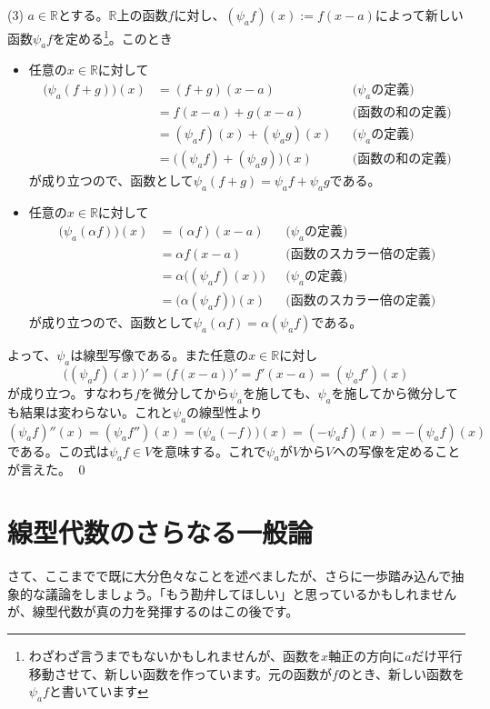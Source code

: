 \noindent (3) $a\in\mathbb{R}$とする。$\mathbb{R}$上の函数$f$に対し、$(\psi_a  f)(x) := f(x-a)$によって新しい函数$\psi_a f$を定める\footnote{わざわざ言うまでもないかもしれませんが、函数を$x$軸正の方向に$a$だけ平行移動させて、新しい函数を作っています。元の函数が$f$のとき、新しい函数を$\psi_a f$と書いています}。このとき
\begin{itemize}
\item 任意の$x\in\mathbb{R}$に対して
\begin{align*}
\bigl(\psi_a(f + g)\bigr)(x)
&= (f + g)(x-a) & & \text{($\psi_a$の定義)} \\
&= f(x - a) + g(x - a) & & \text{(函数の和の定義)} \\
&= (\psi_a f)(x) + (\psi_a g)(x) & & \text{($\psi_a$の定義)} \\
&= \bigl((\psi_a f) + (\psi_a g)\bigr)(x) & & \text{(函数の和の定義)}
\end{align*}
が成り立つので、函数として$\psi_a(f + g) = \psi_a f + \psi_a g$である。
\item 任意の$x\in\mathbb{R}$に対して
\begin{align*}
\bigl(\psi_a(\alpha f)\bigr)(x)
&= (\alpha f)(x - a) & & \text{($\psi_a$の定義)} \\
&= \alpha f(x - a) & & \text{(函数のスカラー倍の定義)} \\
&= \alpha \bigl((\psi_a f)(x)\bigr) & & \text{($\psi_a$の定義)} \\
&= \bigl(\alpha(\psi_a f)\bigr)(x) & & \text{(函数のスカラー倍の定義)}
\end{align*}
が成り立つので、函数として$\psi_a(\alpha f) = \alpha(\psi_a f)$である。
\end{itemize}
よって、$\psi_a$は線型写像である。また任意の$x\in\mathbb{R}$に対し
\[
\bigl((\psi_a f)(x)\bigr)' = \bigl( f(x - a) \bigr)' = f' (x - a) = (\psi_a f')(x)
\]
が成り立つ。すなわち$f$を微分してから$\psi_a$を施しても、$\psi_a$を施してから微分しても結果は変わらない。これと$\psi_a$の線型性より$(\psi_a f)''(x) = (\psi_a f'')(x) = \bigl(\psi_a (-f)\bigr)(x) = (-\psi_a f)(x) = - (\psi_a f)(x)$である。この式は$\psi_a f\in V$を意味する。これで$\psi_a$が$V$から$V$への写像を定めることが言えた。 \qed

\section{線型代数のさらなる一般論}

さて、ここまでで既に大分色々なことを述べましたが、さらに一歩踏み込んで抽象的な議論をしましょう。「もう勘弁してほしい」と思っているかもしれませんが、線型代数が真の力を発揮するのはこの後です。


